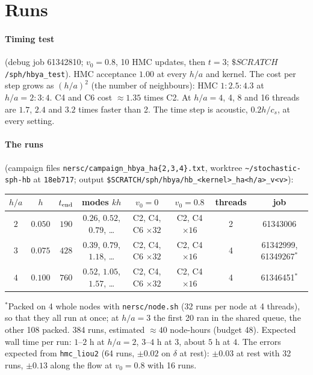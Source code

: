\documentclass[11pt,aps,preprint,nofootinbib,superscriptaddress,tightenlines]{revtex4-2}
\let\oldparagraph\paragraph
\renewcommand{\paragraph}{\par\bigskip\oldparagraph}
\begin{document}
\section{Runs}

\paragraph{Timing test} (debug job 61342810; $v_0=0.8$, 10 HMC updates, then $t=3$; $\$SCRATCH$\texttt{/sph/hbya\_test}).  HMC acceptance $1.00$ at every
$h/a$ and kernel.  The cost per step grows as $(h/a)^2$ (the number of neighbours): HMC $1:2.5:4.3$ at $h/a=2:3:4$.  C4 and C6 cost $\approx1.35$ times C2.
At $h/a=4$, 4, 8 and 16 threads are $1.7$, $2.4$ and $3.2$ times faster than 2.  The time step is acoustic, $0.2h/c_s$, at every setting.

\paragraph{The runs} (campaign files \texttt{nersc/campaign\_hbya\_ha\{2,3,4\}.txt}, worktree \texttt{\textasciitilde/stochastic-sph-hb} at \texttt{18eb717};
output \texttt{\$SCRATCH/sph/hbya/hb\_<kernel>\_ha<h/a>\_v<v>}):
\begin{center}
\begin{tabular}{cccccccc}
\hline
$h/a$ & $h$ & $t_{\rm end}$ & modes $kh$ & $v_0=0$ & $v_0=0.8$ & threads & job \\ \hline
$2$ & $0.050$ & $190$ & $0.26$, $0.52$, $0.79$, \dots & C2, C4, C6 $\times32$ & C2, C4 $\times16$ & 2 & 61343006 \\
$3$ & $0.075$ & $428$ & $0.39$, $0.79$, $1.18$, \dots & C2, C4, C6 $\times32$ & C2, C4 $\times16$ & 4 & 61342999, 61349267$^*$ \\
$4$ & $0.100$ & $760$ & $0.52$, $1.05$, $1.57$, \dots & C2, C4, C6 $\times32$ & C2, C4 $\times16$ & 4 & 61346451$^*$ \\
\hline
\end{tabular}
\end{center}
$^*$Packed on 4 whole nodes with \texttt{nersc/node.sh} (32 runs per node at 4 threads), so that they all run at once; at $h/a=3$ the first 20 ran in the shared queue, the other 108 packed.
384 runs, estimated $\approx40$ node-hours (budget 48).  Expected wall time per run: $1$--$2$ h at $h/a=2$, $3$--$4$ h at $3$, about $5$ h at $4$.
The errors expected from \texttt{hmc\_liou2} (64 runs, $\pm0.02$ on $\delta$ at rest): $\pm0.03$ at rest with 32 runs, $\pm0.13$ along the flow at
$v_0=0.8$ with 16 runs.
\end{document}
